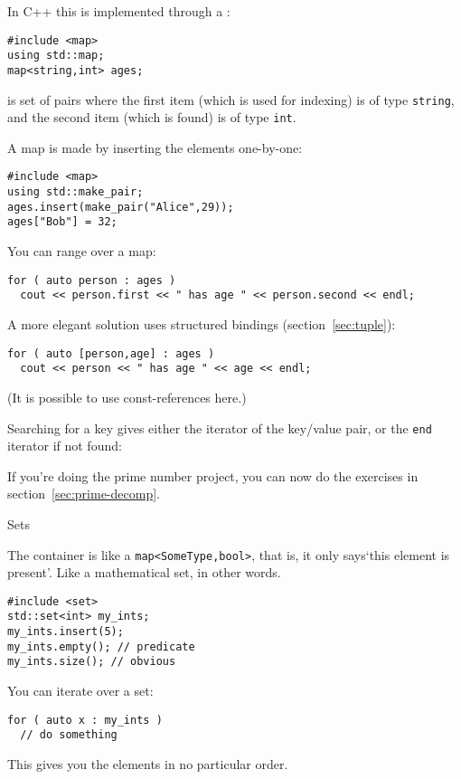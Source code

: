 In C++ this is implemented through a :
\begin{lstlisting}
#include <map>
using std::map;
map<string,int> ages;
\end{lstlisting}
is set of
pairs where the first item (which is used for indexing) is of type
\lstinline{string}, and the second item (which is found) is of type \lstinline{int}.

A map is made by inserting the elements one-by-one:
\begin{lstlisting}
#include <map>
using std::make_pair;
ages.insert(make_pair("Alice",29));
ages["Bob"] = 32;
\end{lstlisting}

You can range over a map:
\begin{lstlisting}
for ( auto person : ages )
  cout << person.first << " has age " << person.second << endl;
\end{lstlisting}
A more elegant solution uses structured bindings (section~\ref{sec:tuple}):
\begin{lstlisting}
for ( auto [person,age] : ages )
  cout << person << " has age " << age << endl;
\end{lstlisting}
(It is possible to use const-references here.)

Searching for a key gives either the iterator of the key/value pair,
or the \lstinline{end} iterator if not found:
%

\begin{exercise}
  If you're doing the prime number project, you can now do
  the exercises in section~\ref{sec:prime-decomp}.
\end{exercise}

 {Sets}
\label{sec:stdset}

The  container is like a \lstinline+map<SomeType,bool>+,
that is, it only says`this element is present'.
Like a mathematical set, in other words.

\begin{lstlisting}
#include <set>
std::set<int> my_ints;
my_ints.insert(5);
my_ints.empty(); // predicate
my_ints.size(); // obvious
\end{lstlisting}

You can iterate over a set:
\begin{lstlisting}
for ( auto x : my_ints )
  // do something  
\end{lstlisting}
This gives you the elements in no particular order.

